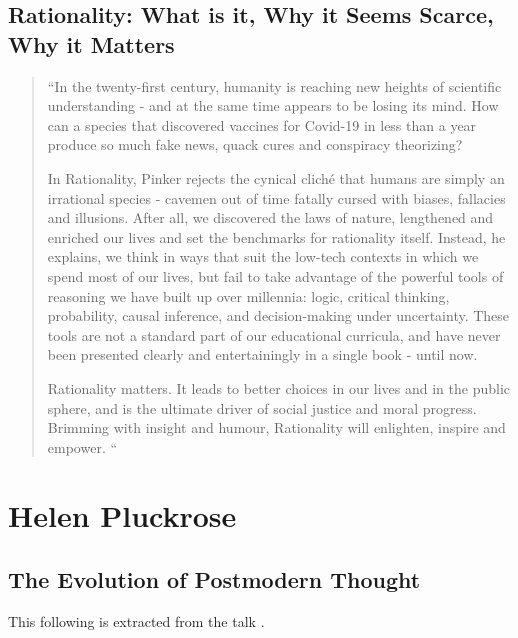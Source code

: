 \documentclass[10pt,titlepage]{book}
\begin{document}
\subsection{Rationality: What is it, Why it Seems Scarce, Why it Matters \cite{pinker-rat}}

\begin{quote}
``In the twenty-first century, humanity is reaching new heights of scientific understanding - and at the same time appears to be losing its mind. How can a species that discovered vaccines for Covid-19 in less than a year produce so much fake news, quack cures and conspiracy theorizing?

In Rationality, Pinker rejects the cynical cliché that humans are simply an irrational species - cavemen out of time fatally cursed with biases, fallacies and illusions. After all, we discovered the laws of nature, lengthened and enriched our lives and set the benchmarks for rationality itself. Instead, he explains, we think in ways that suit the low-tech contexts in which we spend most of our lives, but fail to take advantage of the powerful tools of reasoning we have built up over millennia: logic, critical thinking, probability, causal inference, and decision-making under uncertainty. These tools are not a standard part of our educational curricula, and have never been presented clearly and entertainingly in a single book - until now.

Rationality matters. It leads to better choices in our lives and in the public sphere, and is the ultimate driver of social justice and moral progress. Brimming with insight and humour, Rationality will enlighten, inspire and empower.
``
\end{quote}

\section{Helen Pluckrose}\label{Pluckrose}

\subsection{The Evolution of Postmodern Thought}\label{EPT}

This following is extracted from the talk \cite{pluckrose-evolution}.
\end{document}
